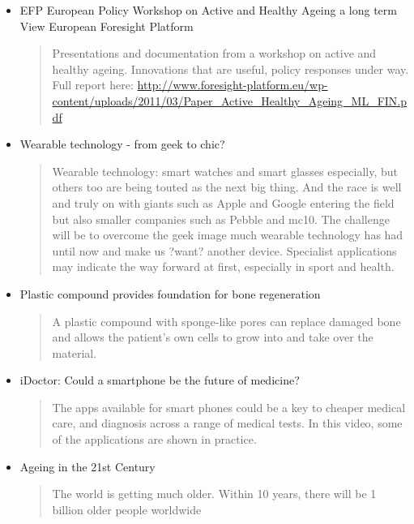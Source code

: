 \begin{itemize}
\begin{quotation}
		Transport and mobility can no longer grow at the same pace without serious environmental, social and economic consequences. 4 visions of mobility in 2050 and the full workshop discussion paper. Need for policies to support more fluid, greener, safer accessible transport.  \url{http://www.foresight-platform.eu/wp-content/uploads/2012/03/EFP-Smart-Mobility-Workshop-Paper.pdf}\end{quotation}
	\item EFP European Policy Workshop on Active and Healthy Ageing a long term View \textregistered European Foresight Platform
	\begin{quotation}
		Presentations and documentation from a workshop on active and healthy ageing.  Innovations that are useful, policy responses under way. Full report here: \url{http://www.foresight-platform.eu/wp-content/uploads/2011/03/Paper\_Active\_Healthy\_Ageing\_ML\_FIN.pdf}\end{quotation}
	\item Wearable technology - from geek to chic?
	\begin{quotation}
		Wearable technology: smart watches and smart glasses especially, but others too are being touted as the next big thing. And the race is well and truly on with giants such as Apple and Google entering the field but also smaller companies such as Pebble and mc10. The challenge will be to overcome the geek image much wearable technology has had until now and make us ?want? another device. Specialist applications may indicate the way forward at first, especially in sport and health.\end{quotation}
	\item Plastic compound provides foundation for bone regeneration
	\begin{quotation}
		A plastic compound with sponge-like pores can replace damaged bone and allows the patient's own cells to grow into and take over the material.\end{quotation}
	\item iDoctor: Could a smartphone be the future of medicine?
	\begin{quotation}
		The apps available for smart phones could be a key to cheaper medical care, and diagnosis across a range of medical tests. In this video, some of the applications are shown in practice.\end{quotation}
	\item Ageing in the 21st Century
	\begin{quotation}
		The world is getting much older. Within 10 years, there will be 1 billion older people worldwide\end{quotation}

\end{itemize}
